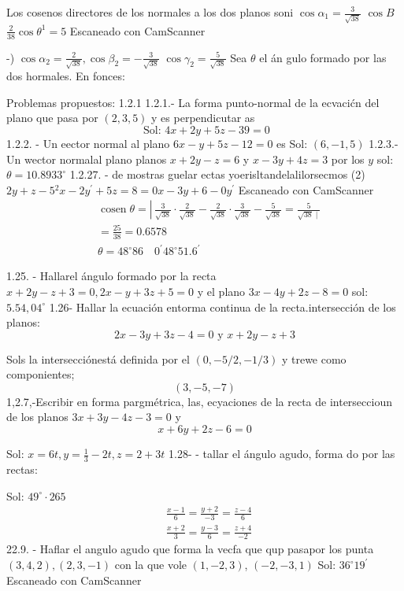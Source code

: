 Los cosenos directores de los normales a los dos planos soni
$\cos \alpha_1=\frac{3}{\sqrt{38}}$
$\cos B$
$\frac{2}{38} \cos \theta^1=5$
Escaneado con CamScanner




-)
$\cos \alpha_2=\frac{2}{\sqrt{38}}, \cos \beta_2=-\frac{3}{\sqrt{38}}$
$\cos \gamma_2=\frac{5}{\sqrt{38}}$
Sea $\theta$ el án gulo formado por las dos
hormales. En fonces:

Problemas propuestos: 1.2.1
1.2.1.- La forma punto-normal de la ecvacićn del plano que pasa por $(2,3,5)$ y es perpendicutar as
$$
\text { Sol: } 4 x+2 y+5 z-39=0
$$
1.2.2. - Un eector normal al plano $6 x-y+5 z-12=0$ es Sol: $(6,-1,5)$
1.2.3.- Un wector normalal plano planos $x+2 y-z=6$ y $x-3 y+4 z=3$ por los $y$ sol: $\theta=10.8933^{\circ}$
1.2.27. - de mostras guelar ectas yoerisltandelalilorsecmos (2) $2 y+z-5{ }^2 x-2 y^{\prime}+5 z=8=0 x-3 y+6-0 y^{\prime}$
Escaneado con CamScanner
$$
\begin{aligned}
	& \operatorname{cosen} \theta=\left\lvert\, \frac{3}{\sqrt{38}} \cdot \frac{2}{\sqrt{38}}-\frac{2}{\sqrt{38}} \cdot \frac{3}{\sqrt{38}}-\frac{5}{\sqrt{38}}=\frac{5}{\sqrt{38} \mid}\right. \\
	& =\frac{25}{38}=0.6578 \\
	& \theta=48^{\circ} 86 \quad 0^{\prime} 48^{\circ} 51.6^{\prime}
\end{aligned}
$$




1.25. - Hallarel ángulo formado por la recta $x+2 y-z+3=0,2 x-y+3 z+5=0$ y el plano $3 x-4 y+2 z-8=0$
sol: $5.54,04^{\circ}$
1.26- Hallar la ecuación entorma continua de la recta.intersección de los planos:
$$
2 x-3 y+3 z-4=0 \text { y } x+2 y-z+3
$$

Sols la intersecciónestá definida por el
$(0,-5 / 2,-1 / 3)$ y trewe como componientes;
$$
(3,-5,-7)
$$
1,2.7,-Escribir en forma pargmétrica, las, ecyaciones de la recta de interseccioun de los planos $3 x+3 y-4 z-3=0$ y
$$
x+6 y+2 z-6=0
$$

Sol: $x=6 t, y=\frac{1}{3}-2 t, z=2+3 t$
1.28- - tallar el ángulo agudo, forma do por las rectas:

Sol: $49^{\circ} \cdot 265$
$$
\begin{aligned}
	& \frac{x-1}{6}=\frac{y+2}{-3}=\frac{z-4}{6} \\
	& \frac{x+2}{3}=\frac{y-3}{6}=\frac{z+4}{-2}
\end{aligned}
$$
22.9. - Haflar el angulo agudo que forma la vecfa que qup pasapor los punta $(3,4,2),(2,3,-1)$ con la que vole $(1,-2,3)$, $(-2,-3,1)$ Sol: $36^{\circ} 19^{\prime}$
Escaneado con CamScanner



